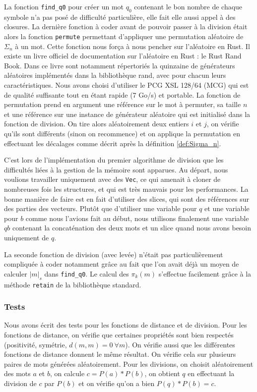 La fonction \texttt{find\_q0} pour créer un mot $q_0$ contenant le bon nombre de chaque symbole n'a pas posé de difficulté particulière, elle fait elle aussi appel à des closures. La dernière fonction à coder avant de pouvoir passer à la division était alors la fonction \texttt{permute} permettant d'appliquer une permutation aléatoire de $\Sigma_n$ à un mot. Cette fonction nous força à nous pencher sur l'aléatoire en Rust. Il existe un livre officiel de documentation sur l'aléatoire en Rust : le Rust Rand Book. Dans ce livre sont notamment répertoriés la quinzaine de générateurs aléatoires implémentés dans la bibliothèque rand, avec pour chacun leurs caractéristiques. Nous avons choisi d'utiliser  le PCG XSL 128/64 (MCG) qui est de qualité suffisante tout en étant rapide (7 Go/s) et portable. La fonction de permutation prend en argument une référence sur le mot à permuter, sa taille $n$ et une référence sur une instance de générateur aléatoire qui est initialisé dans la fonction de division. On tire alors aléatoirement deux entiers $i$ et $j$, on vérifie qu'ils sont différents (sinon on recommence) et on applique la permutation en effectuant les décalages comme décrit après la définition \ref{def:Sigma_n}.

C'est lors de l'implémentation du premier algorithme de division que les difficultés liées à la gestion de la mémoire sont apparues. Au départ, nous voulions travailler uniquement avec des \texttt{Vec}, ce qui amenait à cloner de nombreuses fois les structures, et qui est très mauvais pour les performances. La bonne manière de faire est en fait d'utiliser des slices, qui sont des références sur des parties des vecteurs. Plutôt que d'utiliser une variable pour $q$ et une variable pour $b$ comme nous l'avions fait au début, nous utilisons finalement une variable $qb$ contenant la concaténation des deux mots et un slice quand nous avons besoin uniquement de $q$.

La seconde fonction de division (avec levée) n'était pas particulièrement compliquée à coder notamment grâce au fait que l'on avait déjà un moyen de calculer $|m|_s$ dans \texttt{find\_q0}. Le calcul des $\pi_k(m)$ s'effectue facilement grâce à la méthode \texttt{retain} de la bibliothèque standard.

\subsubsection{Tests}
Nous avons écrit des tests pour les fonctions de distance et de division. Pour les fonctions de distance, on vérifie que certaines propriétés sont bien respectés (positivité, symétrie, $d(m,m)=0 \ \forall m$). On vérifie aussi que les différentes fonctions de distance donnent le même résultat. On vérifie cela sur plusieurs paires de mots générées aléatoirement. Pour les divisions, on choisit aléatoirement des mots $a$ et $b$, on calcule $c = P(a)*P(b)$, on obtient $q$ en effectuant la division de $c$ par $P(b)$ et on vérifie qu'on a bien $P(q)*P(b)=c$.
